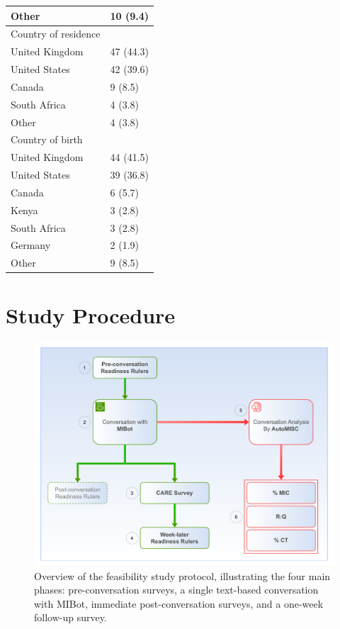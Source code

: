\begin{table}[htbp]
\begin{tabular}{l l}
\quad Other & 10 (9.4) \\
\hline
Country of residence & \\
\quad United Kingdom & 47 (44.3) \\
\quad United States & 42 (39.6) \\
\quad Canada & 9 (8.5) \\
\quad South Africa & 4 (3.8) \\
\quad Other & 4 (3.8) \\
\hline
Country of birth & \\
\quad United Kingdom & 44 (41.5) \\
\quad United States & 39 (36.8) \\
\quad Canada & 6 (5.7) \\
\quad Kenya & 3 (2.8) \\
\quad South Africa & 3 (2.8) \\
\quad Germany & 2 (1.9) \\
\quad Other & 9 (8.5) \\
\hline
\end{tabular}
\label{tab:participant-characteristics}
\end{table}

\section{Study Procedure}
\begin{figure}[ht]
    \centering
    \includegraphics[width=0.9\linewidth]{fig/feasibility_study_flow.pdf}
    \caption[Feasibility Study Protocol Overview]{Overview of the feasibility study protocol, illustrating the four main phases: pre-conversation surveys, a single text-based conversation with MIBot, immediate post-conversation surveys, and a one-week follow-up survey.}
    \label{fig:study-flow}
\end{figure}

